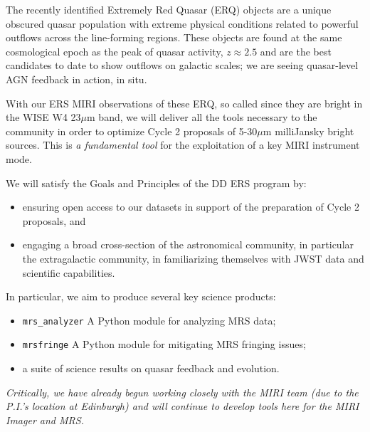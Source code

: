 
The recently identified Extremely Red Quasar (ERQ) objects are a
unique obscured quasar population with extreme physical conditions
related to powerful outflows across the line-forming regions. These
objects are found at the same cosmological epoch as the peak of quasar
activity, $z\approx2.5$ and are the best candidates to date to show
outflows on galactic scales; we are seeing quasar-level AGN feedback
in action, in situ. 

With our ERS MIRI observations of these ERQ, so called since they are
bright in the WISE W4 23$\mu$m band, we will deliver all the tools
necessary to the community in order to optimize Cycle 2 proposals of
5-30$\mu$m milliJansky bright sources. This is {\it a fundamental
tool} for the exploitation of a key MIRI instrument mode.

\noindent
We will satisfy the Goals and Principles of the DD ERS program by:
\begin{itemize}
\item ensuring open access to our datasets in support of the preparation of Cycle 2 proposals, and
\item engaging a broad cross-section of the astronomical community, in particular the extragalactic community, in familiarizing themselves with JWST data and scientific capabilities.
\end{itemize}

\noindent
In particular, we aim to produce several key science products:
\begin{itemize}
\item {\tt mrs\_analyzer} A Python module for analyzing MRS data; 
\item {\tt mrsfringe} A Python module for mitigating MRS fringing issues; 
\item a suite of science results on quasar feedback and evolution. 
\end{itemize}

\noindent
{\it Critically, we have already begun working closely with the MIRI team (due to the P.I.'s location at Edinburgh) and will continue to develop tools here for the MIRI Imager and MRS.}\\


